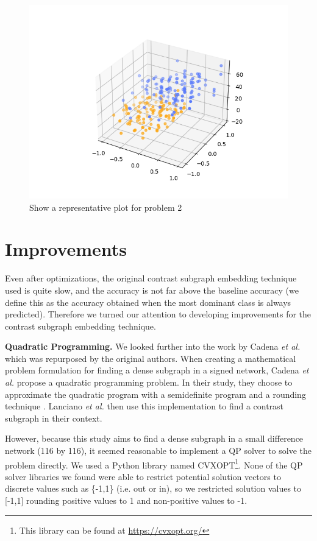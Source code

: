 \documentclass[letterpaper]{article}
\begin{document}
\begin{figure}
    \centering
    \includegraphics[width=\columnwidth, keepaspectratio=true]{test.png}
    \caption{Show a representative plot for problem 2}
    \label{fig:prob2}
\end{figure}




\section{Improvements} \label{improvements}

Even after optimizations, the original contrast subgraph embedding technique used is quite slow, and the accuracy is not far above the baseline accuracy (we define this as the accuracy obtained when the most dominant class is always predicted).
Therefore we turned our attention to developing improvements for the contrast subgraph embedding technique.

\textbf{Quadratic Programming.}
We looked further into the work by Cadena \emph{et al.} which was repurposed by the original authors.
When creating a mathematical problem formulation for finding a dense subgraph in a signed network, Cadena \emph{et al.} propose a quadratic programming problem.
In their study, they choose to approximate the quadratic program with a semidefinite program and a rounding technique \cite{cadena2016}.
Lanciano \emph{et al.} then use this implementation to find a contrast subgraph in their context.

However, because this study aims to find a dense subgraph in a small difference network (116 by 116), it seemed reasonable to implement a QP solver to solve the problem directly.
We used a Python library named CVXOPT\footnote{This library can be found at \url{https://cvxopt.org/}}.
None of the QP solver libraries we found were able to restrict potential solution vectors to discrete values such as \{-1,1\} (i.e. out or in), so we restricted solution values to [-1,1] rounding positive values to 1 and non-positive values to -1.
\end{document}

